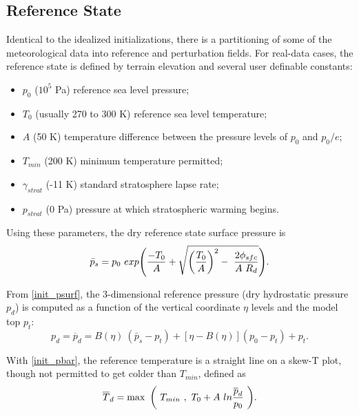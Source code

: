 \subsection{Reference State}
\label{initialization_real_base_section}
Identical to the idealized initializations, there is a partitioning of some of the 
meteorological data into reference and perturbation fields.
For real-data cases, the reference state is defined by terrain elevation and several user definable constants:
\begin{itemize}\setlength{\parskip}{-5pt}
\item $p_{0}$ ($10^5$ Pa) reference sea level pressure; 
\item $T_{0}$ (usually 270 to 300 K) reference sea level temperature; 
\item $A$ (50 K) temperature difference between the pressure levels of $p_{0}$ and $p_{0}/e$;
\item $T_{min}$ (200 K) minimum temperature permitted; 
\item $\gamma_{strat}$ (-11 K) standard stratosphere lapse rate;
\item $p_{strat}$ (0 Pa) pressure at which stratospheric warming begins.
\end{itemize}

\noindent Using these parameters, the dry reference state surface pressure is
\begin{equation}
\bar p_{s} = p_{0}~exp\Bigg({-T_{0} \over A} + 
                     \sqrt{ {\bigg( {T_{0} \over A } \bigg)}^2 - ~
                            { 2\phi_{sfc} \over { A~R_d}} } \Bigg).
\label{init_psurf}
\end{equation}

\noindent From \eqref{init_psurf}, the 3-dimensional reference pressure (dry hydrostatic pressure $p_{d}$)
is computed as
a function of the vertical coordinate $\eta$ levels and the model top $p_{t}$:
\begin{equation}
p_{d} = \overline{p}_d = B(\eta) ~( \bar p_{s} - p_{t} ) +[\eta-B(\eta)](p_0-p_t) + p_{t}.
\label{init_pbar}
\end{equation}

\noindent With \eqref{init_pbar}, the reference temperature is a straight line on a skew-T plot, though 
not permitted to get colder than $T_{min}$, defined as
\begin{equation}
\overline{T}_d = \max~\bigg(~T_{min}~,~ T_0 + A~ln {\overline{p}_d \over p_0}~\bigg).
\notag
\end{equation}

